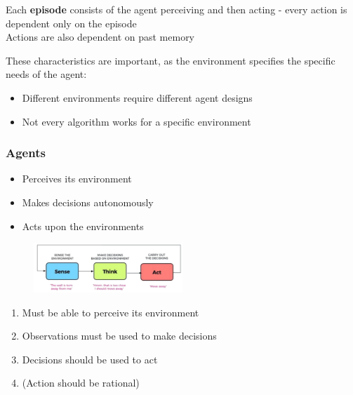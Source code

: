 \documentclass[
../../EiKI_Summary.tex,
]
{subfiles}
\begin{document}
\begin{defbox}
     Each \textbf{episode} consists of the agent perceiving and then acting -  every action is dependent only on the episode\\
     Actions are also dependent on past memory
\end{defbox}

These characteristics are important, as the environment specifies the specific needs of the agent: 
\begin{itemize}
    \item Different environments require different agent designs
    \item Not every algorithm works for a specific environment
\end{itemize} 

\subsubsection{Agents}
\begin{itemize}
    \item {} Perceives its environment
    \item {} Makes decisions autonomously
    \item {} Acts upon the environments
\end{itemize}

\begin{figure}
    [htp]
    \centering
    \includegraphics[width=0.5\textwidth]{Pics/02/Agent.png}
\end{figure}

\begin{defbox}
    \begin{enumerate}
        \item Must be able to perceive its environment
        \item Observations must be used to make decisions
        \item Decisions should be used to act
        \item (Action should be rational)
    \end{enumerate}
\end{defbox}
\end{document}

